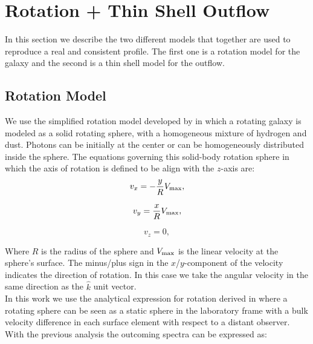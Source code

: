 \appendix
\setcounter{chapter}{0}
\renewcommand{\chaptername}{Appendix}
\renewcommand{\theequation}{\Alph{chapter}.\arabic{section}.\arabic{equation}}
\setcounter{equation}{0}
\chapter{Rotation + Thin Shell Outflow}

In this section we describe the two different models that together are used to reproduce a real and consistent \lya profile. The first one is a rotation model for the galaxy and the second is a thin shell model for the outflow. \\ 

\section{Rotation Model}

We use the simplified rotation model developed by \cite{Garavito14} in which a rotating galaxy is modeled as a solid rotating sphere, with a homogeneous mixture of hydrogen and dust. Photons can be initially at the center or can be homogeneously distributed inside the sphere. The equations governing this solid-body rotation sphere in
which the axis of rotation is defined to be align with the $z$-axis are: \\

\begin{equation}
	v_{x}=-\frac{y}{R}V_{\rm max}, \label{subeq1}
\end{equation}

\begin{equation}
	v_{y}=\frac{x}{R}V_{\rm max}, \label{subeq2}
\end{equation}

\begin{equation}
	v_{z}=0, \label{subeq3}
\end{equation}

Where $R$ is the radius of the sphere and $V_{\rm max}$ is the linear velocity at the sphere's surface. The minus/plus sign in the $x$/$y$-component of the velocity indicates the direction of rotation. In this case we take the angular velocity in the same direction as the $\hat{k}$ unit vector.\\

In this work we use the analytical expression for rotation derived in \cite{Garavito14} where a rotating sphere can be seen as a static sphere in the laboratory frame with a bulk velocity difference in each surface element with respect to a distant observer. With the previous analysis the outcoming spectra can be expressed as:\\

